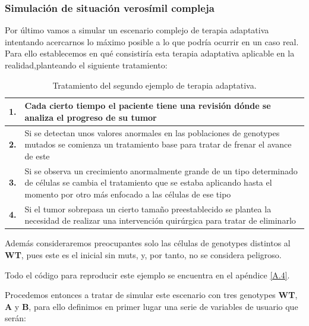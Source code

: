 \subsubsection{Simulación de situación verosímil compleja}\label{5.3.2.2}
Por último vamos a simular un escenario complejo de terapia adaptativa intentando acercarnos lo máximo posible a lo que podría ocurrir en un caso real. Para ello establecemos en qué consistiría esta terapia adaptativa aplicable en la realidad,planteando el siguiente tratamiento:

\begin{table}[h]
	\footnotesize
	\begin{tabular}{|p{0.3cm}|p{15.2cm}|}
		\hline
		\textbf{1.} & Cada cierto tiempo el paciente tiene una revisión dónde se analiza el progreso de su \gls{tumor} \\ \hline
		\textbf{2.} & Si se detectan unos valores anormales en las poblaciones de \glspl{genotype} mutados se comienza un tratamiento base para tratar de frenar el avance de este \\ \hline
		\textbf{3.} & Si se observa un crecimiento anormalmente grande de un tipo determinado de células se cambia el tratamiento que se estaba aplicando hasta el momento por otro más enfocado a las células de ese tipo \\ \hline
		\textbf{4.} & Si el tumor sobrepasa un cierto tamaño preestablecido se plantea la necesidad de realizar una intervención quirúrgica para tratar de eliminarlo \\ \hline
	\end{tabular}
	\caption{Tratamiento del segundo ejemplo de terapia adaptativa.}
	\label{tab:ejemplocomplejotreat}
\end{table}

Además consideraremos preocupantes solo las células de \glspl{genotype} distintos al \textbf{WT}, pues este es el inicial sin \glspl{mut}, y, por tanto, no se considera peligroso.

Todo el código para reproducir este ejemplo se encuentra en el apéndice \ref{A.4}.

Procedemos entonces a tratar de simular este escenario con tres \glspl{genotype} \textbf{WT}, \textbf{A} y \textbf{B}, para ello definimos en primer lugar una serie de variables de usuario que serán:

